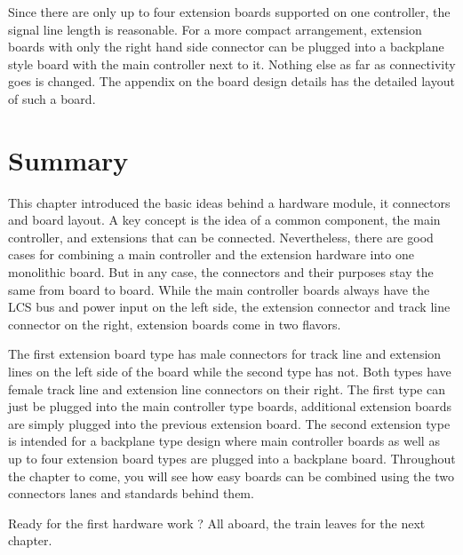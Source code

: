 Since there are only up to four extension boards supported on one controller, the signal line length is reasonable. For a more compact arrangement, extension boards with only the right hand side connector can be plugged into a backplane style board with the main controller next to it. Nothing else as far as connectivity goes is changed. The appendix on the board design details has the detailed layout of such a board.

\section{Summary}

This chapter introduced the basic ideas behind a hardware module, it connectors and board layout. A key concept is the idea of a common component, the main controller, and extensions that can be connected. Nevertheless, there are good cases for combining a main controller and the extension hardware into one monolithic board. But in any case, the connectors and their purposes stay the same from board to board. While the main controller boards always have the LCS bus and power input on the left side, the extension connector and track line connector on the right, extension boards come in two flavors. 

The first extension board type has male connectors for track line and extension lines on the left side of the board while the second type has not. Both types have female track line and extension line connectors on their right. The first type can just be plugged into the main controller type boards, additional extension boards are simply plugged into the previous extension board. The second extension type is intended for a backplane type design where main controller boards as well as up to four extension board types are plugged into a backplane board. Throughout the chapter to come, you will see how easy boards can be combined using the two connectors lanes and standards behind them. 

Ready for the first hardware work ? All aboard, the train leaves for the next chapter.

